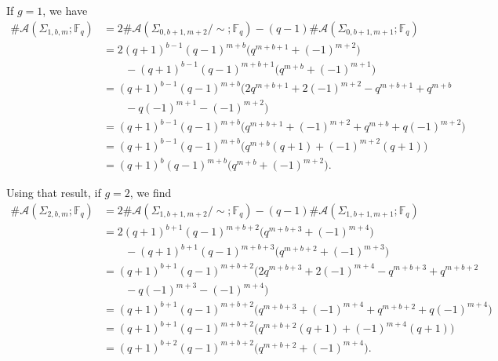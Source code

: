 \documentclass[reqno,12pt]{amsart}
\theoremstyle{definition}
\theoremstyle{remark}
\theoremstyle{remark}
\numberwithin{equation}{section}
\begin{document}
If $g=1$, we have 
\begin{align*}
    \#\mathcal{A}(\Sigma_{1,b,m}; \mathbb{F}_q) &=  2\#\mathcal{A}(\Sigma_{0,b+1,m+2}/\!\sim; \mathbb{F}_q) - (q-1) \#\mathcal{A}(\Sigma_{0,b+1,m+1}; \mathbb{F}_q) \\
    &= 2 (q+1)^{b-1} (q-1)^{m+b} \big(q^{m+b+1} + (-1)^{m+2}\big) \\ &\quad\quad - (q+1)^{b-1} (q-1)^{m+b+1} \big(q^{m+b} + (-1)^{m+1}\big) \\
    &= (q+1)^{b-1} (q-1)^{m+b} \big(2q^{m+b+1} + 2(-1)^{m+2} - q^{m+b+1} + q^{m+b}  \\ &\quad\quad  - q(-1)^{m+1} - (-1)^{m+2}\big) \\
    &= (q+1)^{b-1} (q-1)^{m+b} \big(q^{m+b+1} + (-1)^{m+2} + q^{m+b} + q(-1)^{m+2} \big) \\
    &= (q+1)^{b-1} (q-1)^{m+b} \big(q^{m+b}(q+1) + (-1)^{m+2}(q+1) \big) \\
    &= (q+1)^{b} (q-1)^{m+b} \big(q^{m+b} + (-1)^{m+2} \big). 
\end{align*}

Using that result, if $g=2$, we find 
\begin{align*}
    \#\mathcal{A}(\Sigma_{2,b,m}; \mathbb{F}_q) &=  2\#\mathcal{A}(\Sigma_{1,b+1,m+2}/\!\sim; \mathbb{F}_q) - (q-1) \#\mathcal{A}(\Sigma_{1,b+1,m+1}; \mathbb{F}_q) \\
    &= 2 (q+1)^{b+1} (q-1)^{m+b+2} \big(q^{m+b+3} + (-1)^{m+4} \big) \\ &\quad\quad - (q+1)^{b+1} (q-1)^{m+b+3} \big(q^{m+b+2} + (-1)^{m+3} \big) \\
    &= (q+1)^{b+1} (q-1)^{m+b+2} \big(2q^{m+b+3} + 2(-1)^{m+4} - q^{m+b+3} + q^{m+b+2}  \\ &\quad\quad  - q(-1)^{m+3} - (-1)^{m+4}\big) \\
    &= (q+1)^{b+1} (q-1)^{m+b+2} \big(q^{m+b+3} + (-1)^{m+4} + q^{m+b+2} + q(-1)^{m+4} \big) \\
    &= (q+1)^{b+1} (q-1)^{m+b+2} \big(q^{m+b+2}(q+1) + (-1)^{m+4}(q+1) \big) \\
    &= (q+1)^{b+2} (q-1)^{m+b+2} \big(q^{m+b+2} + (-1)^{m+4} \big). 
\end{align*}
\end{document}
